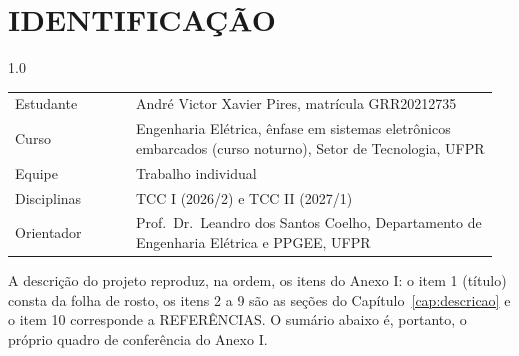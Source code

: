 
\chapter*{IDENTIFICAÇÃO}

\begin{spacing}{1.0}

\noindent
\begin{tabular}{@{}p{0.24\linewidth}p{0.72\linewidth}@{}}
\toprule
Estudante & André Victor Xavier Pires, matrícula GRR20212735 \\[0.2em]
Curso & Engenharia Elétrica, ênfase em sistemas eletrônicos embarcados
(curso noturno), Setor de Tecnologia, UFPR \\[0.2em]
Equipe & Trabalho individual \\[0.2em]
Disciplinas & TCC I (2026/2) e TCC II (2027/1) \\
\midrule
Orientador & Prof.\ Dr.\ Leandro dos Santos Coelho, Departamento de Engenharia
Elétrica e PPGEE, UFPR \\
\bottomrule
\end{tabular}

\vspace{1.2em}

\noindent
{\footnotesize A descrição do projeto reproduz, na ordem, os itens do Anexo I: o
item 1 (título) consta da folha de rosto, os itens 2 a 9 são as seções do
Capítulo~\ref{cap:descricao} e o item 10 corresponde a REFERÊNCIAS. O sumário
abaixo é, portanto, o próprio quadro de conferência do Anexo I.}

\end{spacing}

\vspace{1em}

